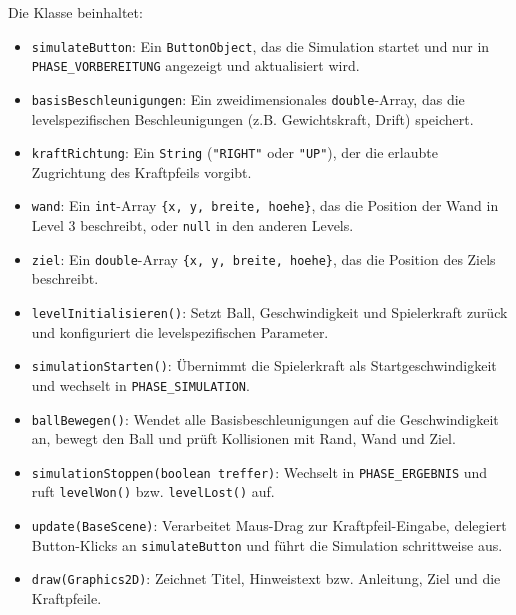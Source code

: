 Die Klasse beinhaltet:
\begin{sloppypar}
    \begin{itemize}
        \item \texttt{simulateButton}: Ein \texttt{ButtonObject}, das die Simulation startet und nur in \texttt{PHASE\_VORBEREITUNG} angezeigt und aktualisiert wird.
        \item \texttt{basisBeschleunigungen}: Ein zweidimensionales \texttt{double}-Array, das die levelspezifischen Beschleunigungen (z.B. Gewichtskraft, Drift) speichert.
        \item \texttt{kraftRichtung}: Ein \texttt{String} (\texttt{"RIGHT"} oder \texttt{"UP"}), der die erlaubte Zugrichtung des Kraftpfeils vorgibt.
        \item \texttt{wand}: Ein \texttt{int}-Array \texttt{\{x, y, breite, hoehe\}}, das die Position der Wand in Level 3 beschreibt, oder \texttt{null} in den anderen Levels.
        \item \texttt{ziel}: Ein \texttt{double}-Array \texttt{\{x, y, breite, hoehe\}}, das die Position des Ziels beschreibt.
        \item \texttt{levelInitialisieren()}: Setzt Ball, Geschwindigkeit und Spielerkraft zurück und konfiguriert die levelspezifischen Parameter.
        \item \texttt{simulationStarten()}: Übernimmt die Spielerkraft als Startgeschwindigkeit und wechselt in \texttt{PHASE\_SIMULATION}.
        \item \texttt{ballBewegen()}: Wendet alle Basisbeschleunigungen auf die Geschwindigkeit an, bewegt den Ball und prüft Kollisionen mit Rand, Wand und Ziel.
        \item \texttt{simulationStoppen(boolean treffer)}: Wechselt in \texttt{PHASE\_ERGEBNIS} und ruft \texttt{levelWon()} bzw. \texttt{levelLost()} auf.
        \item \texttt{update(BaseScene)}: Verarbeitet Maus-Drag zur Kraftpfeil-Eingabe, delegiert Button-Klicks an \texttt{simulateButton} und führt die Simulation schrittweise aus.
        \item \texttt{draw(Graphics2D)}: Zeichnet Titel, Hinweistext bzw. Anleitung, Ziel und die Kraftpfeile.
    \end{itemize}
\end{sloppypar}

